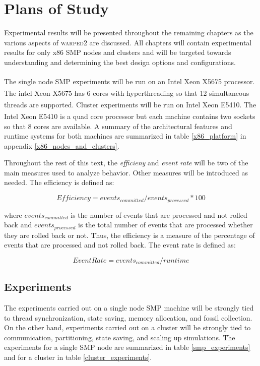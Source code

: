 \documentclass[11pt]{book}
\begin{document}
\chapter{Plans of Study}\label{plans_of_study}

Experimental results will be presented throughout the remaining chapters as the various aspects
of \textsc{warped2} are discussed.  All chapters will contain experimental results for only x86
SMP nodes and clusters and will be targeted towards understanding and determining the best
design options and configurations.

The single node SMP experiments will be run on an Intel\textsuperscript{\textregistered}
Xeon\textsuperscript{\textregistered} X5675 processor.  The intel\textsuperscript{\textregistered} Xeon
\textsuperscript{\textregistered} X5675 has 6 cores with hyperthreading so that 12 simultaneous
threads are supported.  Cluster experiments will be run on Intel\textsuperscript{\textregistered}
Xeon\textsuperscript{\textregistered} E5410.  The Intel\textsuperscript{\textregistered}
Xeon\textsuperscript{\textregistered} E5410 is a quad core processor but each machine contains
two sockets so that 8 cores are available.  A summary of the architectural features and runtime
systems for both machines are summarized in table \ref{x86_platform} in appendix \ref{x86_nodes_and_clusters}.

Throughout the rest of this text, the \emph{efficieny} and \emph{event rate} will be two of the main
measures used to analyze behavior.  Other measures will be introduced as needed.  The efficiency
is defined as:

$$ Efficiency = {events_{committed}}/{events_{processed}} * 100 $$

\noindent
where $events_{committed}$ is the number of events that are processed and not rolled back and
$events_{processed}$ is the total number of events that are processed whether they are rolled
back or not.  Thus, the efficiency is a measure of the percentage of events that are processed
and not rolled back.  The event rate is defined as:

$$ Event Rate = {events_{committed}}/{runtime} $$

\section{Experiments}

The experiments carried out on a single node SMP machine will be strongly tied to thread
synchronization, state saving, memory allocation, and fossil collection.  On the other hand,
experiments carried out on a cluster will be strongly tied to communication, partitioning,
state saving, and scaling up simulations.  The experiments for a single SMP node are summarized
in table \ref{smp_experiments} and for a cluster in table \ref{cluster_experiments}.
\end{document}
